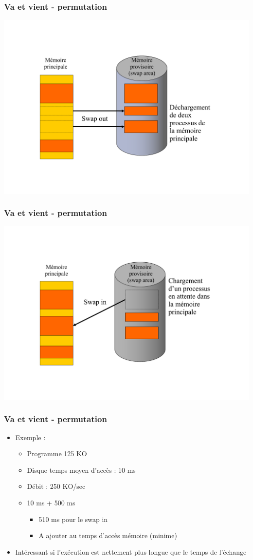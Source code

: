 \begin{frame}
\frametitle{Va et vient - permutation}
\includegraphics[width=.9\textwidth]{../illustration/permut_swap_exemple2.pdf}
\end{frame}


\begin{frame}
\frametitle{Va et vient - permutation}
\includegraphics[width=.9\textwidth]{../illustration/permut_swap_exemple3.pdf}
\end{frame}


\begin{frame}
\frametitle{Va et vient - permutation}
\begin{itemize}
\item Exemple :
\begin{itemize}
\item Programme 125 KO
\item Disque temps moyen d'accès : 10 ms
\item Débit : 250 KO/sec
\item 10 ms + 500 ms
\begin{itemize}
\item 510 ms pour le swap in
\item A ajouter au temps d'accès mémoire (minime)
\end{itemize}
\end{itemize}
\item Intéressant si l'exécution est nettement plus longue que le temps de l'échange
\end{itemize}
\end{frame}


